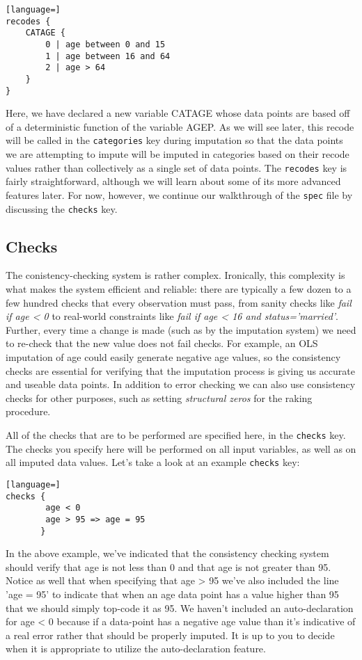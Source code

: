 \documentclass{article}
\begin{document}
\begin{lstlisting}[language=]
recodes {
    CATAGE {
        0 | age between 0 and 15
        1 | age between 16 and 64
        2 | age > 64
    }
}
\end{lstlisting}

Here, we have declared a new variable CATAGE whose data points are based off of a 
deterministic function of the variable AGEP. As we will see later, this recode will be called 
in the {\tt categories} key during imputation so that the data points we are attempting to 
impute will be imputed in categories based on their recode values rather than collectively 
as a single set of data points. The {\tt recodes} key is fairly straightforward, although we 
will learn about some of its more advanced features later. For now, however, we continue 
our walkthrough of the {\tt spec} file by discussing the {\tt checks} key.

\subsection{Checks}
The conistency-checking system is rather complex. Ironically, this complexity is what 
makes the system efficient and reliable: there are typically a
few dozen to a few hundred checks that every observation must pass, from sanity checks
like {\em fail if age < 0} to real-world constraints like {\em fail if age < 16 and
status='married'}. Further, every time a change is made (such as by the imputation system)
we need to re-check that the new value does not fail checks. For example, an OLS imputation of age
could easily generate negative age values, so the consistency checks are essential
for verifying that the imputation process is giving us accurate and useable data points. In addition 
to error checking we can also use consistency checks for other purposes, such as setting 
{\em structural zeros} for the raking procedure.

All of the checks that are to be performed are specified here, in the {\tt checks} key. 
The checks you specify here will be performed on all input variables, as well as on all 
imputed data values. Let's take a look at an example {\tt checks} key:

\begin{lstlisting}[language=]
checks {
    	age < 0
        age > 95 => age = 95
       }
\end{lstlisting}

In the above example, we've indicated that the consistency checking system should verify that 
age is not less than 0 and that age is not greater than 95. Notice as well that when specifying 
that age > 95 we've also included the line 'age = 95' to indicate that when an age data point has 
a value higher than 95 that we should simply top-code it as 95. We haven't included an auto-declaration 
for age < 0 because if a data-point has a negative age value than it's indicative of a real error rather 
that should be properly imputed. It is up to you to decide when it is appropriate to utilize the 
auto-declaration feature.\\
\end{document}

